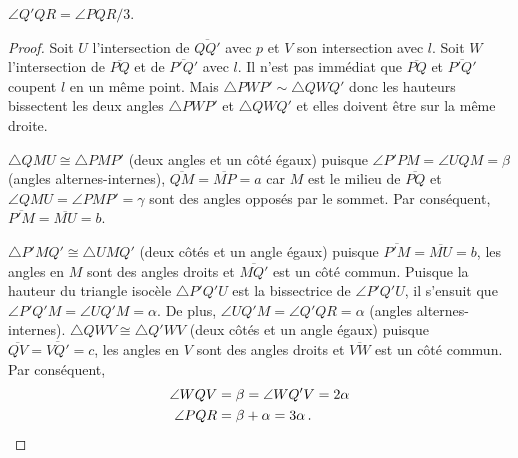 \begin{theorem}
$\angle Q'QR=\angle PQR/3$.
\end{theorem}
\begin{proof}
Soit $U$ l'intersection de $\overline{QQ'}$ avec $p$ et $V$ son intersection avec $l$. Soit $W$ l'intersection de $\overline{PQ}$ et de $\overline{P'Q'}$ avec $l$. Il n'est pas immédiat que $\overline{PQ}$ et $\overline{P'Q'}$ coupent $l$ en un même point. Mais $\triangle PWP' \sim \triangle QWQ'$ donc les hauteurs bissectent les deux angles $\triangle PWP'$ et $\triangle QWQ'$ et elles doivent être sur la même droite.

$\triangle QMU\cong \triangle PMP'$  (deux angles et un côté égaux)  puisque  $\angle P'PM=\angle UQM=\beta$ (angles alternes-internes), $\overline{QM}=\overline{MP}=a$ car $M$ est le milieu de $\overline{PQ}$ et $\angle QMU=\angle PMP'=\gamma$ sont des angles opposés par le sommet. Par conséquent,  $\overline{P'M}=\overline{MU}=b$.


$\triangle P'MQ'\cong \triangle UMQ'$ (deux côtés et un angle égaux) puisque  $\overline{P'M}=\overline{MU}=b$, les angles en $M$ sont des angles droits et $\overline{MQ'}$ est un côté commun. Puisque la hauteur du triangle isocèle $\triangle P'Q'U$ est la bissectrice de $\angle P'Q'U$, il s'ensuit que $\angle P'Q'M=\angle UQ'M=\alpha$. De plus, $\angle UQ'M=\angle Q'QR=\alpha$ (angles  alternes-internes). $\triangle QWV\cong\triangle Q'WV$ (deux côtés et un  angle égaux) puisque $\overline{QV}=\overline{VQ'}=c$, les angles en $V$ sont des angles droits et $\overline{VW}$ est un côté commun. Par conséquent,
\begin{align*}
\angle WQV&=\beta=\angle WQ'V=2\alpha\\
\angle PQR &= \beta + \alpha = 3\alpha\,.\qedhere
\end{align*}
\end{proof}

